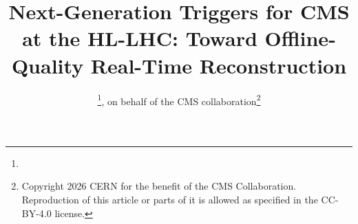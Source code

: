 \documentclass{webofc}
\begin{document}
%
%
%
\title{Next-Generation Triggers for CMS at the HL-LHC: Toward Offline-Quality Real-Time Reconstruction}
%
%
% 
\author{
   \fnsep\thanks{}, on behalf of the CMS collaboration\footnote{Copyright 2026 CERN for the benefit of the CMS Collaboration. Reproduction of this article or parts of it is allowed as specified in the CC-BY-4.0 license.}
}
% 
%
\abstract{}
%
\maketitle
%
\end{document}
